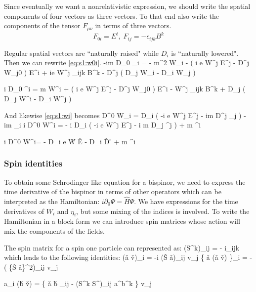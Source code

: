 Since eventually we want a nonrelativistic expression, we should write the spatial components of four vectors as three vectors.  To that end also write the components of the tensor $F_{\mu\nu}$ in terms of three vectors.
$$ F_{0i} = E^i , \; F_{ij} = -\epsilon_{ijk} B^k $$



Regular spatial vectors are ``naturally raised" while $D_i$ is ``naturally lowered".  Then we can rewrite \eqref{eq:s1:w0i}.
\beq
	-im D_0 \eta_i =  - m^2 W_i  -  \left( i e \lambda W^j E^j - D^j W_{j0} \right ) E^i
	+ ie \lambda W^j \epsilon_{ijk} B^k - D^j (  D_j W_i - D_i W_j )
\eeq

\beq
	i D_0 \eta^i =  m W^i  +  \left( i e \lambda W^j E^j - D^j W_{j0} \right ) E^i
	-  W^j \epsilon_{ijk} B^k + D_j (  D_j W^i - D_i W^j )
\eeq

And likewise \eqref{eq:s1:wi} becomes
\beq
		D^0 W_i = D_i \left( -i e \lambda W^j E^j - im  D^j \eta_j \right )  - im \eta_i
\eeq
\beq
		i D^0 W^i = - i D_i \left( -i e \lambda W^j E^j - i m  D_j \eta^j \right )  + m \eta^i
\eeq

\beq
	i D^0 W^i= - D_i  e \lambda \v{W} \cdot \v{E} -  D_i \v{D} \cdot \v{\eta} + m \eta^i
\eeq

\subsubsection{Spin identities}
To obtain some Schrodinger like equation for a bispinor, we need to express the time derivative of the bispinor in terms of other operators which can be interpreted as the Hamiltonian: $i \partial_0 \Psi = \hat{H} \Psi$.  We have expressions for the time derivatives of $W_i$ and $\eta_i$, but some mixing of the indices is involved.  To write the Hamiltonian in a block form we can introduce spin matrices whose action will mix the components of the fields.
	

The spin matrix for a spin one particle can represented as:
\beq
	(S^k)_{ij} = - i\epsilon_{ijk}
\eeq
which leads to the following identities:
\beq
	(\v{a} \times \v{v})_i = -i (\v{S} \cdot \v{a})_{ij} v_j
\eeq
\beq
	\{ \v{a} \times (\v{a} \times \v{v}) \}_i = - ( \{\v{S} \cdot \v{a}\}^2)_{ij} v_j
\eeq

\beq
	a_i (\v{b} \cdot \v{v}) = \{ \v{a} \cdot \v{b} \; \delta_{ij} - (S^k S^\ell)_{ij} a^\ell b^k \} v_j
\eeq


